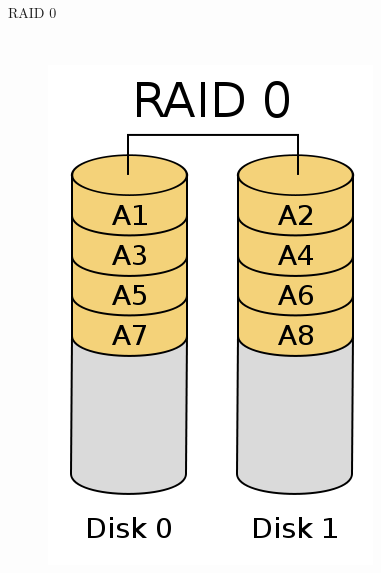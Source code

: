 \begin{frame}{RAID 0}
\begin{columns}
		\begin{figure}
			\includegraphics[width=\textwidth]{imagens/RAID_0}
			\label{fig:exemplo}
		\end{figure}
		
	\end{columns}
\end{frame}

